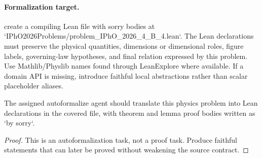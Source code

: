 \paragraph{Formalization target.}
create a compiling Lean file with sorry bodies at `IPhO2026Problems/problem\_IPhO\_2026\_4\_B\_4.lean`.
The Lean declarations must preserve the physical quantities, dimensions or dimensional roles, figure labels, governing-law hypotheses, and final relation expressed by this problem.
Use Mathlib/Physlib names found through LeanExplore where available. If a domain API is missing, introduce faithful local abstractions rather than scalar placeholder aliases.

\begin{theorem}
\label{thm:physics:IPhO_2026_4_B_4:target}
The assigned autoformalize agent should translate this physics problem into Lean declarations in the covered file, with theorem and lemma proof bodies written as `by sorry`.
\end{theorem}
\begin{proof}
This is an autoformalization task, not a proof task. Produce faithful statements that can later be proved without weakening the source contract.
\end{proof}


